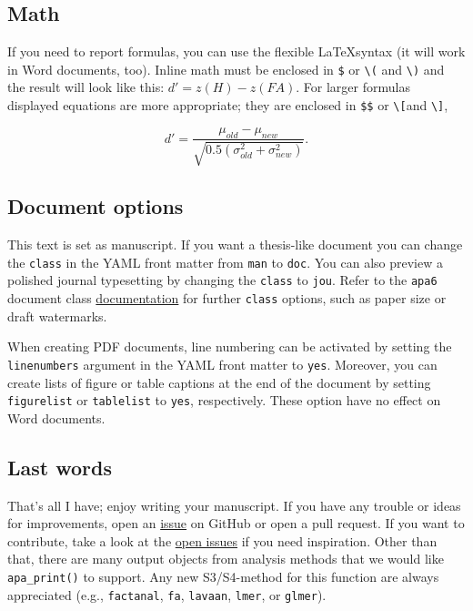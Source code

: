 \documentclass[english,man,floatsintext]{apa6}
\begin{document}
\hypertarget{math}{%
\subsection{Math}\label{math}}

If you need to report formulas, you can use the flexible \LaTeX syntax (it will work in Word documents, too).
Inline math must be enclosed in \texttt{\$} or \texttt{\textbackslash{}(} and \texttt{\textbackslash{})} and the result will look like this: \(d' = z(H) - z(FA)\).
For larger formulas displayed equations are more appropriate; they are enclosed in \texttt{\$\$} or \texttt{\textbackslash{}{[}}and \texttt{\textbackslash{}{]}},

\[
d' = \frac{\mu_{old} - \mu_{new}}{\sqrt{0.5(\sigma^2_{old} + \sigma^2_{new})}}.
\]

\hypertarget{document-options}{%
\subsection{Document options}\label{document-options}}

This text is set as manuscript.
If you want a thesis-like document you can change the \texttt{class} in the YAML front matter from \texttt{man} to \texttt{doc}.
You can also preview a polished journal typesetting by changing the \texttt{class} to \texttt{jou}.
Refer to the \texttt{apa6} document class \href{ftp://ftp.fu-berlin.de/tex/CTAN/macros/latex/contrib/apa6/apa6.pdf}{documentation} for further \texttt{class} options, such as paper size or draft watermarks.

When creating PDF documents, line numbering can be activated by setting the \texttt{linenumbers} argument in the YAML front matter to \texttt{yes}.
Moreover, you can create lists of figure or table captions at the end of the document by setting \texttt{figurelist} or \texttt{tablelist} to \texttt{yes}, respectively.
These option have no effect on Word documents.

\hypertarget{last-words}{%
\subsection{Last words}\label{last-words}}

That's all I have; enjoy writing your manuscript.
If you have any trouble or ideas for improvements, open an \href{https://github.com/crsh/papaja/issues}{issue} on GitHub or open a pull request.
If you want to contribute, take a look at the \href{https://github.com/crsh/papaja/issues}{open issues} if you need inspiration.
Other than that, there are many output objects from analysis methods that we would like \texttt{apa\_print()} to support.
Any new S3/S4-method for this function are always appreciated (e.g., \texttt{factanal}, \texttt{fa}, \texttt{lavaan}, \texttt{lmer}, or \texttt{glmer}).
\end{document}
